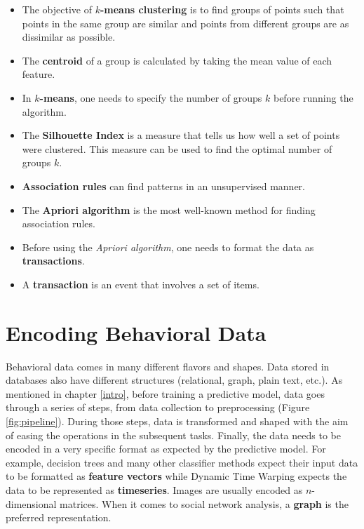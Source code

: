 \documentclass[
  11pt,
]{krantz}
\providecommand{\tightlist}{%
  \setlength{\itemsep}{0pt}\setlength{\parskip}{0pt}}
\begin{document}
\begin{itemize}
\tightlist
\item
  The objective of \textbf{\(k\)-means clustering} is to find groups of points such that points in the same group are similar and points from different groups are as dissimilar as possible.
\item
  The \textbf{centroid} of a group is calculated by taking the mean value of each feature.
\item
  In \textbf{\(k\)-means}, one needs to specify the number of groups \(k\) before running the algorithm.
\item
  The \textbf{Silhouette Index} is a measure that tells us how well a set of points were clustered. This measure can be used to find the optimal number of groups \(k\).
\item
  \textbf{Association rules} can find patterns in an unsupervised manner.
\item
  The \textbf{Apriori algorithm} is the most well-known method for finding association rules.
\item
  Before using the \emph{Apriori algorithm}, one needs to format the data as \textbf{transactions}.
\item
  A \textbf{transaction} is an event that involves a set of items.
\end{itemize}



\hypertarget{representations}{%
\chapter{Encoding Behavioral Data}\label{representations}}

Behavioral data comes in many different flavors and shapes. Data stored in databases also have different structures (relational, graph, plain text, etc.). As mentioned in chapter \ref{intro}, before training a predictive model, data goes through a series of steps, from data collection to preprocessing (Figure \ref{fig:pipeline}). During those steps, data is transformed and shaped with the aim of easing the operations in the subsequent tasks. Finally, the data needs to be encoded in a very specific format as expected by the predictive model. For example, decision trees and many other classifier methods expect their input data to be formatted as \textbf{feature vectors} while Dynamic Time Warping expects the data to be represented as \textbf{timeseries}. Images are usually encoded as \(n\)-dimensional matrices. When it comes to social network analysis, a \textbf{graph} is the preferred representation.
\end{document}
